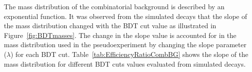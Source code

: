 



The mass distribution of the combinatorial background is described by an exponential function. It was observed from the simulated \bbbarmumux decays that the slope of the mass distribution changed with the BDT cut value as illustrated in Figure~\ref{fig:BDTmasses}. The change in the slope value is accounted for in the mass distribution used in the pseudoexperiment by changing the slope parameter ($\lambda$) for each BDT cut. Table~\ref{tab:EfficiencyRatioCombBG} shows the slope of the mass distribution for different BDT cuts values evaluated from \bbbarmumux simulated decays.

